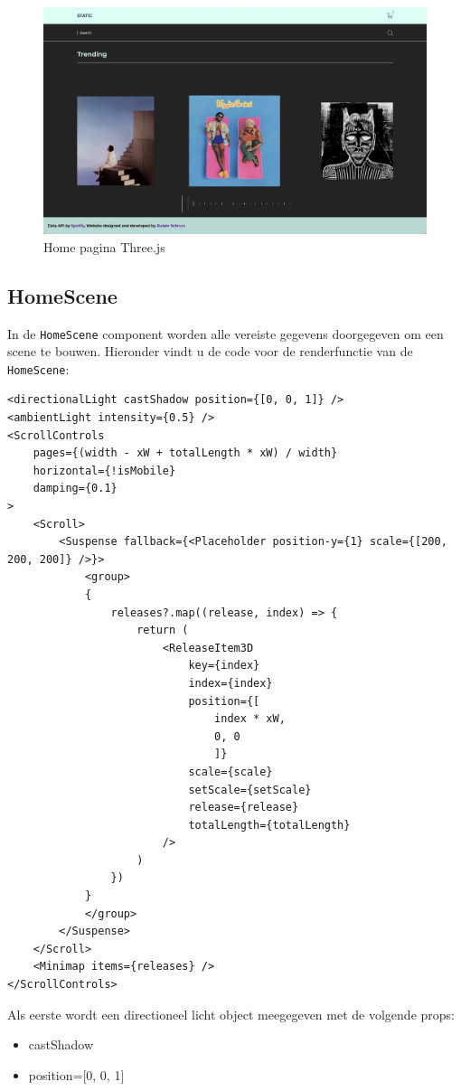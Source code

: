\begin{figure}
	\centering
	\includegraphics[width=1\linewidth]{graphics/desktopHomeThree}
	\caption[Home pagina Three.js]{Home pagina Three.js}
	\label{fig:desktopHomeThree}
\end{figure}

\newpage
\subsection{HomeScene}

In de \texttt{HomeScene} component worden alle vereiste gegevens doorgegeven om een scene te bouwen. Hieronder vindt u de code voor de renderfunctie van de \texttt{HomeScene}:
\newline
\newline
\begin{BVerbatim}
<directionalLight castShadow position={[0, 0, 1]} />
<ambientLight intensity={0.5} />
<ScrollControls
	pages={(width - xW + totalLength * xW) / width}
	horizontal={!isMobile}
	damping={0.1}
>
	<Scroll>
		<Suspense fallback={<Placeholder position-y={1} scale={[200, 200, 200]} />}>
			<group>
			{
				releases?.map((release, index) => {
					return (
						<ReleaseItem3D
							key={index}
							index={index}
							position={[
								index * xW,
								0, 0
								]}
							scale={scale}
							setScale={setScale}
							release={release}
							totalLength={totalLength}
						/>
					)
				})
			}
			</group>
		</Suspense>
	</Scroll>
	<Minimap items={releases} />
</ScrollControls>
\end{BVerbatim}
\newpage

Als eerste wordt een directioneel licht object meegegeven met de volgende props:

\begin{itemize}
	\item castShadow
	\item position={[0, 0, 1]}
\end{itemize}

